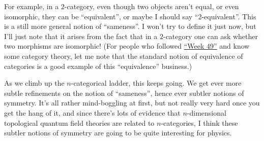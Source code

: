 \documentclass{article}
\begin{document}
For example, in a \(2\)-category, even though two objects aren't equal,
or even isomorphic, they can be ``equivalent'', or maybe I should say
``2-equivalent''. This is a still more general notion of ``sameness''. I
won't try to define it just now, but I'll just note that it arises from
the fact that in a \(2\)-category one can ask whether two morphisms are
isomorphic! (For people who followed \protect\hyperlink{week49}{``Week
49''} and know some category theory, let me note that the standard
notion of equivalence of categories is a good example of this
``equivalence'' business.)

As we climb up the \(n\)-categorical ladder, this keeps going. We get
ever more subtle refinements on the notion of ``sameness'', hence ever
subtler notions of symmetry. It's all rather mind-boggling at first, but
not really very hard once you get the hang of it, and since there's lots
of evidence that \(n\)-dimensional topological quantum field theories
are related to \(n\)-categories, I think these subtler notions of
symmetry are going to be quite interesting for physics.
\end{document}
